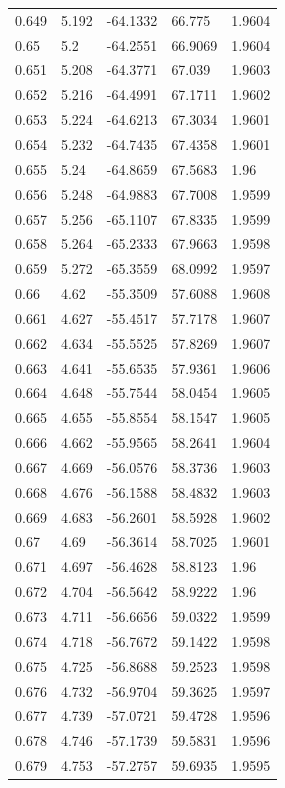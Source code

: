 \begin{tabular}{lllll}
0.649 & 5.192 & -64.1332 & 66.775 & 1.9604 \\
0.65 & 5.2 & -64.2551 & 66.9069 & 1.9604 \\
0.651 & 5.208 & -64.3771 & 67.039 & 1.9603 \\
0.652 & 5.216 & -64.4991 & 67.1711 & 1.9602 \\
0.653 & 5.224 & -64.6213 & 67.3034 & 1.9601 \\
0.654 & 5.232 & -64.7435 & 67.4358 & 1.9601 \\
0.655 & 5.24 & -64.8659 & 67.5683 & 1.96 \\
0.656 & 5.248 & -64.9883 & 67.7008 & 1.9599 \\
0.657 & 5.256 & -65.1107 & 67.8335 & 1.9599 \\
0.658 & 5.264 & -65.2333 & 67.9663 & 1.9598 \\
0.659 & 5.272 & -65.3559 & 68.0992 & 1.9597 \\
0.66 & 4.62 & -55.3509 & 57.6088 & 1.9608 \\
0.661 & 4.627 & -55.4517 & 57.7178 & 1.9607 \\
0.662 & 4.634 & -55.5525 & 57.8269 & 1.9607 \\
0.663 & 4.641 & -55.6535 & 57.9361 & 1.9606 \\
0.664 & 4.648 & -55.7544 & 58.0454 & 1.9605 \\
0.665 & 4.655 & -55.8554 & 58.1547 & 1.9605 \\
0.666 & 4.662 & -55.9565 & 58.2641 & 1.9604 \\
0.667 & 4.669 & -56.0576 & 58.3736 & 1.9603 \\
0.668 & 4.676 & -56.1588 & 58.4832 & 1.9603 \\
0.669 & 4.683 & -56.2601 & 58.5928 & 1.9602 \\
0.67 & 4.69 & -56.3614 & 58.7025 & 1.9601 \\
0.671 & 4.697 & -56.4628 & 58.8123 & 1.96 \\
0.672 & 4.704 & -56.5642 & 58.9222 & 1.96 \\
0.673 & 4.711 & -56.6656 & 59.0322 & 1.9599 \\
0.674 & 4.718 & -56.7672 & 59.1422 & 1.9598 \\
0.675 & 4.725 & -56.8688 & 59.2523 & 1.9598 \\
0.676 & 4.732 & -56.9704 & 59.3625 & 1.9597 \\
0.677 & 4.739 & -57.0721 & 59.4728 & 1.9596 \\
0.678 & 4.746 & -57.1739 & 59.5831 & 1.9596 \\
0.679 & 4.753 & -57.2757 & 59.6935 & 1.9595 \\

\end{tabular}
